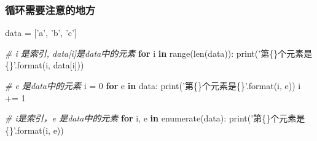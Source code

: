 \documentclass[11pt]{article}
\newenvironment{Shaded}{}{}
\newcommand{\KeywordTok}[1]{\textcolor[rgb]{0.00,0.44,0.13}{\textbf{{#1}}}}
\newcommand{\DecValTok}[1]{\textcolor[rgb]{0.25,0.63,0.44}{{#1}}}
\newcommand{\StringTok}[1]{\textcolor[rgb]{0.25,0.44,0.63}{{#1}}}
\newcommand{\CommentTok}[1]{\textcolor[rgb]{0.38,0.63,0.69}{\textit{{#1}}}}
\newcommand{\NormalTok}[1]{{#1}}
\newcommand{\SpecialCharTok}[1]{\textcolor[rgb]{0.25,0.44,0.63}{{#1}}}
\newcommand{\ControlFlowTok}[1]{\textcolor[rgb]{0.00,0.44,0.13}{\textbf{{#1}}}}
\newcommand{\OperatorTok}[1]{\textcolor[rgb]{0.40,0.40,0.40}{{#1}}}
\newcommand{\BuiltInTok}[1]{{#1}}
\begin{document}
    \subsubsection{循环需要注意的地方}\label{ux5faaux73afux9700ux8981ux6ce8ux610fux7684ux5730ux65b9}

\begin{Shaded}
\begin{Highlighting}[]
\NormalTok{data }\OperatorTok{=}\NormalTok{ [}\StringTok{'a'}\NormalTok{, }\StringTok{'b'}\NormalTok{, }\StringTok{'c'}\NormalTok{]}

\CommentTok{# i 是索引, data[i]是data中的元素}
\ControlFlowTok{for}\NormalTok{ i }\KeywordTok{in} \BuiltInTok{range}\NormalTok{(}\BuiltInTok{len}\NormalTok{(data)):}
    \BuiltInTok{print}\NormalTok{(}\StringTok{'第}\SpecialCharTok{\{\}}\StringTok{个元素是}\SpecialCharTok{\{\}}\StringTok{'}\NormalTok{.}\BuiltInTok{format}\NormalTok{(i, data[i]))}
    
\CommentTok{# e 是data中的元素}
\NormalTok{i }\OperatorTok{=} \DecValTok{0}
\ControlFlowTok{for}\NormalTok{ e }\KeywordTok{in}\NormalTok{ data:   }
    \BuiltInTok{print}\NormalTok{(}\StringTok{'第}\SpecialCharTok{\{\}}\StringTok{个元素是}\SpecialCharTok{\{\}}\StringTok{'}\NormalTok{.}\BuiltInTok{format}\NormalTok{(i, e))}
\NormalTok{    i }\OperatorTok{+=} \DecValTok{1}
    
\CommentTok{# i是索引，e 是data中的元素}
\ControlFlowTok{for}\NormalTok{ i, e }\KeywordTok{in} \BuiltInTok{enumerate}\NormalTok{(data):}
    \BuiltInTok{print}\NormalTok{(}\StringTok{'第}\SpecialCharTok{\{\}}\StringTok{个元素是}\SpecialCharTok{\{\}}\StringTok{'}\NormalTok{.}\BuiltInTok{format}\NormalTok{(i, e))}
\end{Highlighting}
\end{Shaded}
\end{document}
